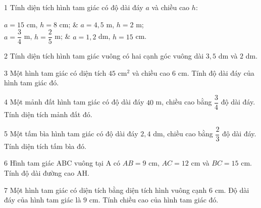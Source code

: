 \begin{probbox}{1}{\relax}
Tính diện tích hình tam giác có độ dài đáy $a$ và chiều cao $h$:
\begin{cols2}
 $a=15$ cm, $h=8$ cm; &  $a=4{,}5$ m, $h=2$ m;\\
 $a=\dfrac34$ m, $h=\dfrac25$ m; &  $a=1{,}2$ dm, $h=15$ cm.
\end{cols2}
\end{probbox}
\gap
\begin{probbox}{2}{\relax}
Tính diện tích hình tam giác vuông có hai cạnh góc vuông dài $3{,}5$ dm và $2$ dm.
\end{probbox}
\gap
\begin{probbox}{3}{\relax}
Một hình tam giác có diện tích $45$ cm$^2$ và chiều cao $6$ cm. Tính độ dài đáy của hình tam giác đó.
\end{probbox}
\gap
\begin{probbox}{4}{\relax}
Một mảnh đất hình tam giác có độ dài đáy $40$ m, chiều cao bằng $\dfrac34$ độ dài đáy. Tính diện tích mảnh đất đó.
\end{probbox}
\gap
\begin{probbox}{5}{\relax}
Một tấm bìa hình tam giác có độ dài đáy $2{,}4$ dm, chiều cao bằng $\dfrac23$ độ dài đáy. Tính diện tích tấm bìa đó.
\end{probbox}
\gap
\begin{probbox}{6}{\relax}
Hình tam giác ABC vuông tại A có $AB=9$ cm, $AC=12$ cm và $BC=15$ cm. Tính độ dài đường cao AH.
\end{probbox}
\gap
\begin{probbox}{7}{\relax}
Một hình tam giác có diện tích bằng diện tích hình vuông cạnh $6$ cm. Độ dài đáy của hình tam giác là $9$ cm. Tính chiều cao của hình tam giác đó.
\end{probbox}
